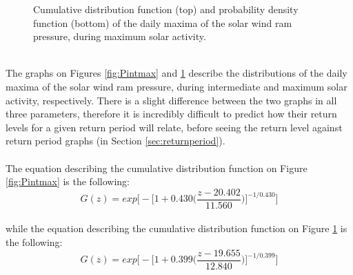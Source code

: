 \documentclass[12pt]{article}
\begin{document}
\begin{figure}[t!]
\begin{minipage}{0.48\textwidth}
                \caption{Cumulative distribution function (top) and probability density function (bottom) of the daily maxima of the solar wind ram pressure, during maximum solar activity.}
                \label{fig:Pmaxmax}
            \end{minipage}
        \end{figure}\\
        The graphs on Figures \ref{fig:Pintmax} and \ref{fig:Pmaxmax} describe the distributions of the daily maxima of the solar wind ram pressure, during intermediate and maximum solar activity, respectively. There is a slight difference between the two graphs in all three parameters, therefore it is incredibly difficult to predict how their return levels for a given return period will relate, before seeing the return level against return period graphs (in Section \ref{sec:returnperiod}).\\ \\
        The equation describing the cumulative distribution function on Figure \ref{fig:Pintmax} is the following:
        \begin{equation}
            G(z) = exp\Bigg [-\Bigg [1+0.430 \Bigg (\frac{z-20.402}{11.560}\Bigg )\Bigg ]^{-1/0.430}\Bigg ]
        \end{equation}\\
        while the equation describing the cumulative distribution function on Figure \ref{fig:Pmaxmax} is the following:
        \begin{equation}
            G(z) = exp\Bigg [-\Bigg [1+0.399 \Bigg (\frac{z-19.655}{12.840}\Bigg )\Bigg ]^{-1/0.399}\Bigg ]
        \end{equation}
\end{document}
